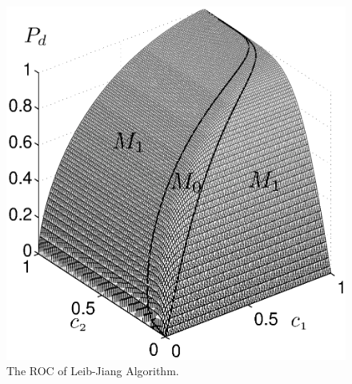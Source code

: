 \documentclass[12pt,journal,a4paper,twoside,onecolumn]{IEEEtran}
\begin{document}
\begin{spacing}{2.5}
\begin{figure}[!t]
\centering
\includegraphics[width=12cm]{LJROC.eps}
\caption{The ROC of Leib-Jiang Algorithm.}
\label{pic: LJS}
\end{figure}


\end{spacing}
\end{document}
